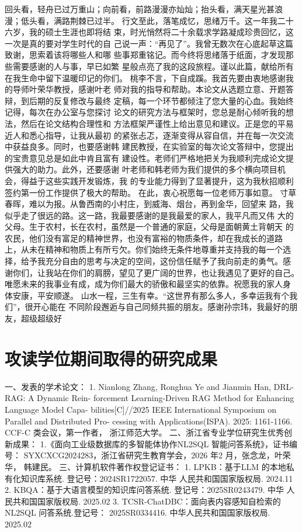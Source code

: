 \documentclass[12pt,a4paper,openright,UTF8]{ctexbook}
\begin{document}
回头看，轻舟已过万重山；向前看，前路漫漫亦灿灿；抬头看，满天星光甚浪
漫；低头看，满路荆棘已过半。
行文至此，落笔成忆，思绪万千。这一年我二十六岁，我的硕士生涯也即将结
束，时光悄然将二十余载求学路凝成珍贵回忆，这一次是真的要对学生时代的自
己说一声：“再见了”。我曾无数次在心底起草这篇致谢，思索着该将哪些人和哪
些事郑重铭记。而今终将思绪落于纸面，才发现那些需要感谢的人与事，早已如繁
星般点亮了我的这段旅程。谨以此篇，献给所有在我生命中留下温暖印记的你们。
桃李不言，下自成蹊。我首先要由衷地感谢我的导师叶荣华教授，感谢叶老
师对我的指导和帮助。本论文从选题立意、开题答辩，到后期的反复修改与最终
定稿，每一个环节都倾注了您大量的心血。我始终记得，每次在办公室与您探讨
论文的研究方法与框架时，您总是耐心倾听我的想法，然后在论文结构合理性和
方法框架严谨性上给出意见和建议。正是您的平易近人和悉心指导，让我从最初
的紧张忐忑，逐渐变得从容自信，并在每一次交流中获益良多。同时，也要感谢韩
建民教授，在实验室的每次论文答辩中，您提出的宝贵意见总是如此中肯且富有
建设性。老师们严格地把关为我顺利完成论文提供强大的助力。此外，还要感谢
叶老师和韩老师为我们提供的多个横向项目机会，得益于这些实践开发锻炼，我
的专业能力得到了显著提升，这为我秋招顺利签约第一份工作提供了极大的帮助。
在此，衷心祝愿每一位老师万事如意。
寸草春晖，难以为报。从鲁西南的小村庄，到威海、烟台，再到金华，回望来
路，我似乎走了很远的路。这一路，我最要感谢的是我最爱的家人，我平凡而又伟
大的父母。生于农村，长在农村，虽然是一个普通的家庭，父母是面朝黄土背朝天
的农民，他们没有富足的精神世界，也没有富裕的物质条件，却在我成长的道路
上，从未在精神和物质上有所亏欠。你们始终无条件地尊重并支持我的每一个选
择，给予我充分自由的思考与决定的空间，这份信任赋予了我向前走的勇气。感
谢你们，让我站在你们的肩膀，望见了更广阔的世界，也让我遇见了更好的自己。
唯愿未来的我事业有成，成为你们最大的骄傲和最坚实的依靠。祝愿我的家人身
体安康，平安顺遂。
山水一程，三生有幸。“这世界有那么多人，多幸运我有个我们”，很开心能在
不同阶段邂逅与自己同频共振的朋友。感谢孙宗玮，我最好的朋友，超级超级好

\chapter*{攻读学位期间取得的研究成果}

一、发表的学术论文：
1. Nianlong Zhang, Ronghua Ye and Jianmin Han, DRL-RAG: A Dynamic Rein-
forcement Learning-Driven RAG Method for Enhancing Language Model Capa-
bilities[C]//2025 IEEE International Symposium on Parallel and Distributed Pro-
cessing with Applications(ISPA). 2025: 1161-1166. CCF-C 类会议，第一作者，
浙江师范大学。
二、浙江省专业学位研究生优秀创新成果：
1.《面向工业级数据库的多智能体协作NL2SQL 智能问答系统》，证书编号：
SYXCXCG2024283，浙江省研究生教育学会，2026 年2 月，张念龙，叶荣华，
韩建民。
三、计算机软件著作权登记证书：
1. LPKB：基于LLM 的本地私有化知识库系统. 登记号：2024SR1722057. 中华
人民共和国国家版权局. 2024.11
2. KBQA：基于大语言模型的知识库问答系统. 登记号：2025SR0243479. 中华
人民共和国国家版权局. 2025.02
3. TCSR-ChatDBC：面向表内容感知自检索的NL2SQL 问答系统.登记号：
2025SR0334416. 中华人民共和国国家版权局. 2025.02
\end{document}
